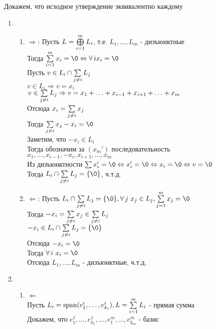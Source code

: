 \documentclass[12pt]{article}
\begin{document}
Докажем, что исходное утверждение эквивалентно каждому
\begin{enumerate}
    \item 
    \begin{enumerate}
        \item $\Rightarrow$:
        Пусть $L=\bigoplus\limits_{i=1}^m L_i$, т.е. $L_1,\ldots,L_m$ - дизъюнктные\\
        Тогда $\suml_{i=1}^m x_i = \0 \Leftrightarrow \forall\,i x_i = \0$\\
        Пусть $v \in L_i \cap \sum\limits_{j\neq i} L_j$\\
        $v \in L_i \Rightarrow v = x_i$\\
        $v \in \sum\limits_{j\neq i} L_j \Rightarrow v = x_1+\ldots+x_{i-1} + x_{i+1} + \ldots + x_m$\\
        Отсюда $x_i = \sum\limits_{j\neq i} x_j$\\
        Тогда $\suml_{j\neq i} x_j - x_i = \0$\\
        Заметим, что $-x_i \in L_i$\\
        Тогда обозначим за $(x_m')$ последовательность $x_1,\ldots,x_{i-1},-x_i,x_{i+1},\ldots,x_m$\\
        Из дизъюнктности $\suml x_i' = \0 \Leftrightarrow x_i'=\0 \Leftrightarrow x_i = \0 \Leftrightarrow v = \0$\\
        Тогда $L_i \cap \suml_{j \neq i} L_j = \{\0\}$, ч.т.д.
        \item $\Leftarrow$:
        Пусть $L_i \cap \suml_{j \neq i} L_j = \{\0\}, \forall\,j\ x_j \in L_j, \suml_{j=1}^m x_j = \0$\\
        Тогда $-x_i = \sum\limits_{j \neq i}x_j \in \sum\limits_{j \neq i}L_j$\\
        $-x_i \in L_i \cap \suml_{j \neq i}L_j = \{\0\}$\\
        Отсюда $-x_i = \0$\\
        Тогда $\forall\,i\ x_i = \0$\\
        Отсюда $L_1,\ldots,L_m$ - дизъюнктные, ч.т.д.
    \end{enumerate}
    \item
    \begin{enumerate}
        \item $\Leftarrow$\\
        Пусть $L_i = \operatorname{span}(e_1^i, \ldots, e_{k_i}^i), L=\sum\limits_{i=1}^m L_i$ - прямая сумма\\
        Докажем, что $e_1^1, \ldots, e_{k_1}^1, \ldots, e_1^m, \ldots, e_{k_m}^m$ - базис\\

\end{enumerate}
\end{enumerate}
\end{document}
